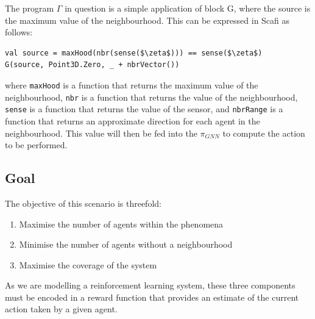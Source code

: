 \documentclass[conference]{IEEEtran}
\begin{document}
The program $\Gamma$ in question is a simple application of block G, where the source is the maximum value of the neighbourhood. 
This can be expressed in Scafi as follows:
\begin{lstlisting}[mathescape=true]
val source = maxHood(nbr(sense($\zeta$))) == sense($\zeta$)
G(source, Point3D.Zero, _ + nbrVector())
\end{lstlisting}
where \texttt{maxHood} is a function that returns the maximum value of the neighbourhood, 
 \texttt{nbr} is a function that returns the value of the neighbourhood, 
\texttt{sense} is a function that returns the value of the sensor, and
\texttt{nbrRange} is a function that returns an approximate direction for each agent in the neighbourhood.
%
This value will then be fed into the $\pi_{GNN}$ to compute the action to be performed.

 
\subsection{Goal}
 The objective of this scenario is threefold:
\begin{enumerate}
\item Maximise the number of agents within the phenomena
\item Minimise the number of agents without a neighbourhood
\item Maximise the coverage of the system
\end{enumerate}
 
As we are modelling a reinforcement learning system, 
 these three components must be encoded in a reward function 
 that provides an estimate of the current action taken by a given agent.
 
\end{document}
